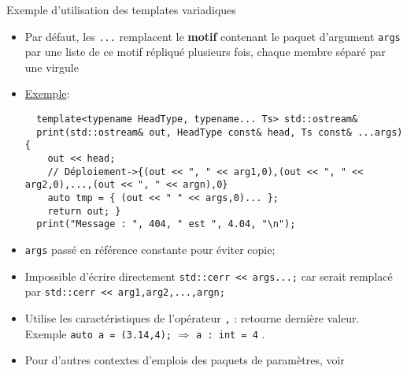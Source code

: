 \documentclass[compress,10pt,aspectratio=169]{beamer}
\begin{document}
  \begin{frame}[fragile]{Exemple d'utilisation des templates variadiques}
    \scriptsize
    \begin{itemize}  
  \item Par défaut, les \texttt{...} remplacent le \textbf{motif} contenant le paquet 
        d'argument \texttt{args} par une liste de ce motif répliqué plusieurs fois,
        chaque membre séparé par une virgule
  \item \underline{\textcolor{NavyBlue}{Exemple}}:
  \begin{verbatim}
  template<typename HeadType, typename... Ts> std::ostream& 
  print(std::ostream& out, HeadType const& head, Ts const& ...args) {
    out << head;
    // Déploiement->{(out << ", " << arg1,0),(out << ", " << arg2,0),...,(out << ", " << argn),0}
    auto tmp = { (out << " " << args,0)... };
    return out; }
  print("Message : ", 404, " est ", 4.04, "\n");
  \end{verbatim}
  \item \texttt{args} passé en référence constante pour éviter copie;
  \item Impossible d'écrire directement \texttt{std::cerr << args...;} car
        serait remplacé par \texttt{std::cerr << arg1,arg2,...,argn;} 
  \item Utilise les caractéristiques de l'opérateur \texttt{,} : retourne dernière
        valeur. Exemple \texttt{auto a = (3.14,4);} $\Rightarrow$ \texttt{a : int = 4} . 
  \item Pour d'autres contextes d'emplois des paquets de paramètres, voir 
  \href{https://en.cppreference.com/w/cpp/language/parameter_pack}{}
  \end{itemize}
\end{frame}  
\end{document}
